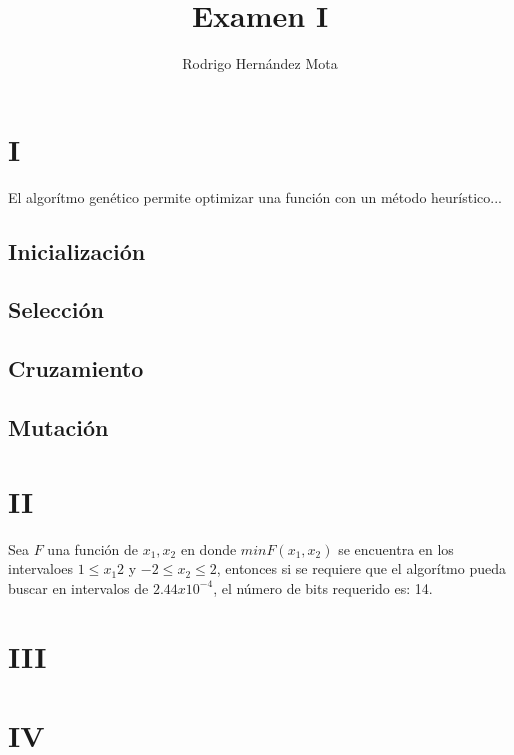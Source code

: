 \documentclass[11p]{report}
\begin{document}
\title{Examen I}
\author{Rodrigo Hern\'andez Mota}

\maketitle

\section{I}
El algor\'itmo gen\'etico permite optimizar una funci\'on con un m\'etodo heur\'istico...
\subsection{Inicializaci\'on}
\subsection{Selecci\'on}
\subsection{Cruzamiento}
\subsection{Mutaci\'on}


\section{II}
Sea $F$ una funci\'on de $x_1, x_2$ en donde $min F(x_1, x_2)$ se encuentra en los intervaloes $1 \leq x_1 2$ y $-2 \leq x_2 \leq 2$, entonces si se requiere que el algor\'itmo pueda buscar en intervalos de $2.44x10^{-4}$, el n\'umero de bits requerido es: 14.


\section{III}

\section{IV}
\end{document}

